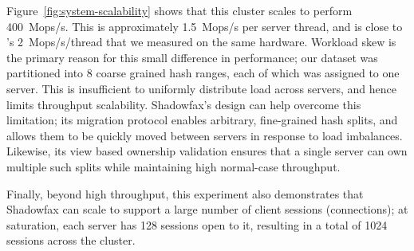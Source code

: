 Figure~\ref{fig:system-scalability} shows that this cluster scales to
perform 400~Mops/s.
%
This is approximately 1.5~Mops/s per server thread, and is close
to \faster's 2~Mops/s/thread that we measured on the same hardware.
%
Workload skew is the primary reason for this small difference in performance;
our dataset was partitioned into 8 coarse grained hash ranges, each of
which was assigned to one server.
%
This is insufficient to uniformly distribute load across servers, and
hence limits throughput scalability.
%
%
%
Shadowfax's design can help overcome this limitation; its migration
protocol enables arbitrary, fine-grained hash splits, and allows them to
be quickly moved between servers in response to load imbalances.
%
Likewise, its view based ownership validation ensures that a single
server can own multiple such splits while maintaining high normal-case
throughput.

Finally, beyond high throughput, this experiment also demonstrates that
Shadowfax can scale to support a large number of client sessions
(connections); at
saturation, each server has 128 sessions open to it, resulting in a
total of 1024 sessions across the cluster.
